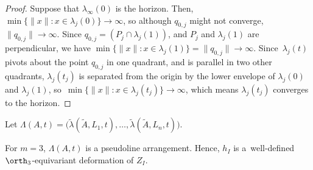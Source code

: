 \begin{proof}
Suppose that $\lambda_\infty(0)$ is the horizon.
Then, $\min \{\|x\| : x \in \lambda_j(0)\} \to \infty$, so
although $q_{0,j}$ might not converge, $\|q_{0,j}\| \to \infty$.
Since $q_{0,j} = (P_{j} \cap \lambda_j(1))$, and $P_{j}$ and $\lambda_j(1)$ are perpendicular, we have $\min \{\|x\| : x \in \lambda_j(1)\} = \|q_{0,j}\| \to \infty$.
Since~$\lambda_j(t)$ pivots about the point $q_{0,j}$ in one quadrant, and is parallel in two other quadrants, $\lambda_j(t_j)$ is separated from the origin by the lower envelope of $\lambda_j(0)$ and $\lambda_j(1)$, so~\hbox{$\min \{\|x\| : x \in \lambda_j(t_j)\} \to \infty$}, which means $\lambda_j(t_j)$ converges to the horizon.
\end{proof}

Let $\Lambda(A,t) = \bigl(\tilde \lambda(\tilde A,L_1,t),\dots,\tilde \lambda(\tilde A,L_n,t)\bigr)$.

\begin{claim}\label{claim-lambda-arrangement-3}
For $m=3$, $\Lambda(A,t)$ is a pseudoline arrangement. Hence, $h_I$ is a~well-defined $\orth_3$-equivariant deformation of $Z_I$.
\end{claim}

